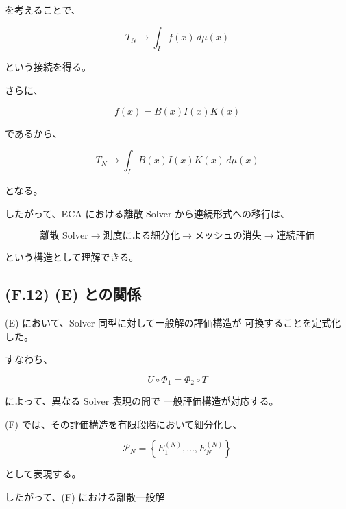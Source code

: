 \documentclass[a4paper,11pt]{article}
\begin{document}
を考えることで、

\begin{equation}
    T_N
    \longrightarrow
    \int_I f(x)\,d\mu(x)
\end{equation}

という接続を得る。

さらに、

\begin{equation}
    f(x)=B(x)I(x)K(x)
\end{equation}

であるから、

\begin{equation}
    \boxed{
        T_N
        \longrightarrow
        \int_I
        B(x)I(x)K(x)\,d\mu(x)
    }
\end{equation}

となる。

したがって、ECA における離散 Solver から連続形式への移行は、

\begin{equation}
    \boxed{
    \text{離散 Solver}
    \longrightarrow
    \text{測度による細分化}
    \longrightarrow
    \text{メッシュの消失}
    \longrightarrow
    \text{連続評価}
    }
\end{equation}

という構造として理解できる。


\subsection{(F.12) (E) との関係}
\label{subsec:F12}

(E) において、Solver 同型に対して一般解の評価構造が
可換することを定式化した。

すなわち、

\begin{equation}
    U\circ\Phi_1
    =
    \Phi_2\circ T
\end{equation}

によって、異なる Solver 表現の間で
一般評価構造が対応する。

(F) では、その評価構造を有限段階において細分化し、

\begin{equation}
    \mathcal{P}_N
    =
    \left\{
        E_1^{(N)},
        \ldots,
        E_N^{(N)}
    \right\}
\end{equation}

として表現する。

したがって、(F) における離散一般解
\end{document}
